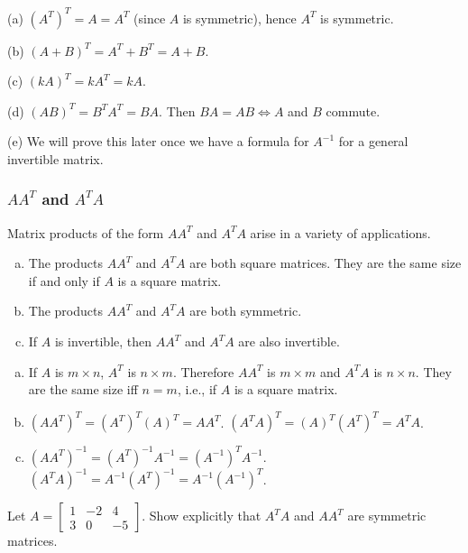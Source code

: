 \documentclass[12pt,letterpaper,reqno]{article}
\numberwithin{equation}{section}
\begin{document}
\begin{pf}
(a) $(A^T)^T=A=A^T$ (since $A$ is symmetric), hence $A^T$ is symmetric. 

(b) $(A+B)^T=A^T+B^T=A+B$.

(c) $(kA)^T=kA^T=kA$. 

(d) $(AB)^T=B^TA^T=BA$. Then $BA=AB \iff A$ and $B$ commute. 

(e) We will prove this later once we have a formula for $A^{-1}$ for a general invertible matrix.
\end{pf}

\subsubsection{$AA^T$ and $A^TA$}
Matrix products of the form $AA^T$ and $A^TA$ arise in a variety of applications. 

\begin{thm}\label{thm:props_of_aat_and_ata}
	\begin{enumerate}[(a)]
		\item The products $AA^T$ and $A^TA$ are both square matrices. They are the same size if and only if $A$ is a square matrix.
		\item The products $AA^T$ and $A^TA$ are both symmetric.
		\item If $A$ is invertible, then $AA^T$ and $A^TA$ are also invertible.
	\end{enumerate}
\end{thm}

\begin{pf}
	\begin{enumerate}[(a)]
		\item If $A$ is $m\times n$, $A^T$ is $n \times m$. Therefore $AA^T$ is $m \times m$ and $A^TA$ is $n \times n$. They are the same size iff $n=m$, i.e., if $A$ is a square matrix.
		\item $(AA^T)^T=(A^T)^T(A)^T=AA^T$. $(A^TA)^T=(A)^T(A^T)^T=A^TA$.
		\item $(AA^T)^{-1}=(A^T)^{-1}A^{-1}=(A^{-1})^TA^{-1}$. $(A^TA)^{-1}=A^{-1}(A^T)^{-1}=A^{-1}(A^{-1})^T$.
	\end{enumerate}
\end{pf}

\begin{exercise}
	Let $A=\begin{bmatrix}
		1 & -2 & 4 \\ 3 & 0 & -5
	\end{bmatrix}$. Show explicitly that $A^TA$ and $AA^T$ are symmetric matrices.	
\end{exercise}
\end{document}

